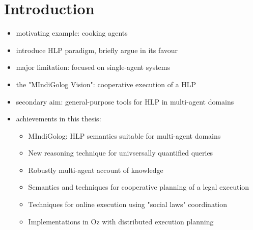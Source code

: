 \chapter{Introduction}

\begin{itemize}
\item motivating example: cooking agents
\item introduce HLP paradigm, briefly argue in its favour
\item major limitation: focused on single-agent systems
\item the "MIndiGolog Vision": cooperative execution of a HLP
\item secondary aim: general-purpose tools for HLP in multi-agent domains
\item achievements in this thesis:
  \begin{itemize}
  \item MIndiGolog: HLP semantics suitable for multi-agent domains
  \item New reasoning technique for univsersally quantified queries
  \item Robustly multi-agent account of knowledge
  \item Semantics and techniques for cooperative planning of a legal execution
  \item Techniques for online execution using "social laws" coordination
  \item Implementations in Oz with distributed execution planning
  \end{itemize}
\end{itemize}

